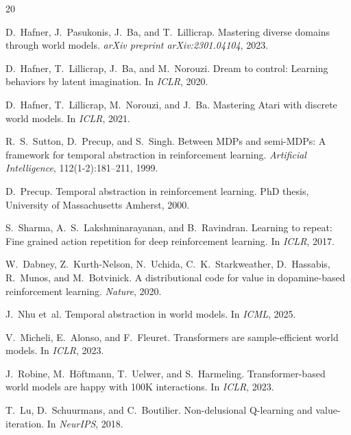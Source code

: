 \documentclass[10pt,letterpaper]{article}
\begin{document}
\begin{thebibliography}{20}

D.~Hafner, J.~Pasukonis, J.~Ba, and T.~Lillicrap.
\newblock Mastering diverse domains through world models.
\newblock \emph{arXiv preprint arXiv:2301.04104}, 2023.

D.~Hafner, T.~Lillicrap, J.~Ba, and M.~Norouzi.
\newblock Dream to control: Learning behaviors by latent imagination.
\newblock In \emph{ICLR}, 2020.

D.~Hafner, T.~Lillicrap, M.~Norouzi, and J.~Ba.
\newblock Mastering Atari with discrete world models.
\newblock In \emph{ICLR}, 2021.

R.~S.~Sutton, D.~Precup, and S.~Singh.
\newblock Between MDPs and semi-MDPs: A framework for temporal abstraction in reinforcement learning.
\newblock \emph{Artificial Intelligence}, 112(1-2):181--211, 1999.

D.~Precup.
\newblock Temporal abstraction in reinforcement learning.
\newblock PhD thesis, University of Massachusetts Amherst, 2000.

S.~Sharma, A.~S.~Lakshminarayanan, and B.~Ravindran.
\newblock Learning to repeat: Fine grained action repetition for deep reinforcement learning.
\newblock In \emph{ICLR}, 2017.

W.~Dabney, Z.~Kurth-Nelson, N.~Uchida, C.~K.~Starkweather, D.~Hassabis, R.~Munos, and M.~Botvinick.
\newblock A distributional code for value in dopamine-based reinforcement learning.
\newblock \emph{Nature}, 2020.

J.~Nhu et~al.
\newblock Temporal abstraction in world models.
\newblock In \emph{ICML}, 2025.

V.~Micheli, E.~Alonso, and F.~Fleuret.
\newblock Transformers are sample-efficient world models.
\newblock In \emph{ICLR}, 2023.

J.~Robine, M.~H\"oftmann, T.~Uelwer, and S.~Harmeling.
\newblock Transformer-based world models are happy with 100K interactions.
\newblock In \emph{ICLR}, 2023.

T.~Lu, D.~Schuurmans, and C.~Boutilier.
\newblock Non-delusional Q-learning and value-iteration.
\newblock In \emph{NeurIPS}, 2018.


\end{thebibliography}
\end{document}
